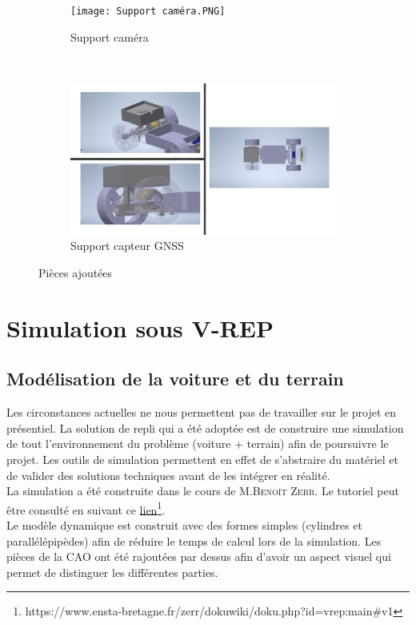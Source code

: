 \documentclass[12pt, openany]{report}
\begin{document}
\begin{figure}[H]
     \centering
     \begin{subfigure}[b]{0.45\textwidth}
         \centering
         \texttt{[image: Support caméra.PNG]}
         \caption{Support caméra}
     \end{subfigure}
     ~
     \begin{subfigure}[b]{0.45\textwidth}
         \centering
         \includegraphics[width=\textwidth, height = 5cm]{Support GPS.PNG}
         \caption{Support capteur \textsc{GNSS}}
     \end{subfigure}
     \caption{Pièces ajoutées}
     \label{fig:piece_aj}
\end{figure}

\section{Simulation sous \textsc{V-REP}}
\subsection{Modélisation de la voiture et du terrain}
Les circonstances actuelles ne nous permettent pas de travailler sur le projet en présentiel. La solution de repli qui a été adoptée est de construire une simulation de tout l'environnement du problème (voiture + terrain) afin de poursuivre le projet. Les outils de simulation permettent en effet de s'abstraire du matériel et de  valider des solutions techniques avant de les intégrer en réalité.\\

La simulation a été construite dans le cours de \textsc{M.Benoît Zerr}. Le tutoriel peut être consulté en suivant ce \href{https://www.ensta-bretagne.fr/zerr/dokuwiki/doku.php?id=vrep:main#v1}{lien}\footnote{https://www.ensta-bretagne.fr/zerr/dokuwiki/doku.php?id=vrep:main#v1}.\\

Le modèle dynamique est construit avec des formes simples (cylindres et parallélépipèdes) afin de réduire le temps de calcul lors de la simulation. Les pièces de la \textsc{CAO} ont été rajoutées par dessus afin d'avoir un aspect visuel qui permet de distinguer les différentes parties.\\
\end{document}
